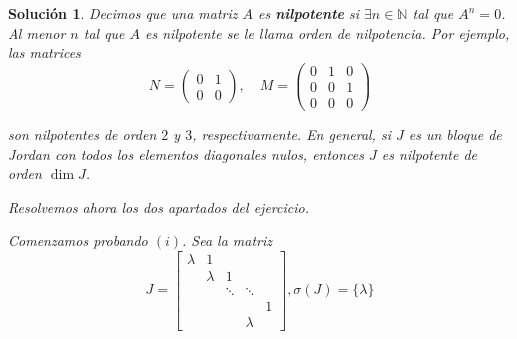 \documentclass[11pt, a4paper]{article}
\newif\IfInSansMode
\theoremstyle{theorem-style}
\theoremstyle{definition-style}
\theoremstyle{remark-style}
\newtheorem*{sol}{Solución}
\theoremstyle{example-style}
\begin{document}
    \begin{sol}
        Decimos que una matriz $A$ es \textbf{nilpotente} si $\exists n \in \mathbb{N}$ tal
        que $A^n = 0$. Al menor $n$ tal que $A$ es nilpotente se le llama \textit{orden de nilpotencia}. Por ejemplo, las matrices
        $$ N = \begin{pmatrix}
            0 & 1 \\
            0 & 0
        \end{pmatrix}, \quad M = 
        \begin{pmatrix}
            0 & 1 & 0 \\
            0 & 0 & 1\\
            0 & 0 & 0
        \end{pmatrix}$$

        son nilpotentes de orden $2$ y $3$, respectivamente. En general, si $J$ es un bloque de Jordan con todos los elementos diagonales nulos, entonces $J$ es nilpotente de orden $\dim J$.

        Resolvemos ahora los dos apartados del ejercicio.

        Comenzamos probando $(i)$. Sea la matriz $$J = \begin{bmatrix}
            \lambda & 1 & & & \\
                    & \lambda & 1 & & \\
                    & & \ddots & \ddots & \\
                    & & & & 1 \\
                    & & & \lambda &
        \end{bmatrix}, \sigma(J) = \{\lambda\}$$


\end{sol}
\end{document}
